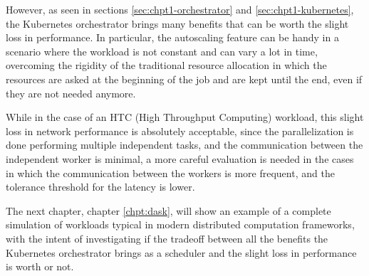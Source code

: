 However, as seen in sections \ref{sec:chpt1-orchestrator} and
\ref{sec:chpt1-kubernetes}, the Kubernetes orchestrator brings many benefits
that can be worth the slight loss in performance.
In particular, the autoscaling feature can be handy in a scenario where the
workload is not constant and can vary a lot in time, overcoming the rigidity of
the traditional resource allocation in which the resources are asked at the
beginning of the job and are kept until the end, even if they are not needed
anymore.

While in the case of an HTC (High Throughput Computing) workload, this slight
loss in network performance is absolutely acceptable, since the parallelization
is done performing multiple independent tasks, and the communication between the
independent worker is minimal, a more careful evaluation is needed in the cases
in which the communication between the workers is more frequent, and the
tolerance threshold for the latency is lower.

The next chapter, chapter \ref{chpt:dask}, will show an example of a complete
simulation of workloads typical in modern distributed computation frameworks,
with the intent of investigating if the tradeoff between all the benefits the
Kubernetes orchestrator brings as a scheduler and the slight loss in performance
is worth or not.
